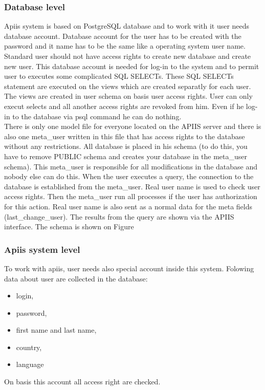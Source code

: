 \subsubsection{Database level}
Apiis system is based on PostgreSQL database and to work with it user needs database account. Database account for the user has to be created with the password and it name has to be the same like a operating system user name. Standard user should not have access rights to create new database and create new user. This database account is needed for log-in to the system and to permit user to executes some complicated SQL SELECTs. These SQL SELECTs statement are executed on the views which are created separatly for each user. The views are created in user schema on basis user access rights. User can only execut selects and all another access rights are revoked from him. Even if he log-in to the database via psql command he can do nothing.\\
There is only one model file for everyone located on the APIIS server and there is also one meta\_user written in this file that has access rights to the database without any restrictions. All database is placed in his schema (to do this, you have to remove PUBLIC schema and creates your database in the meta\_user schema). This meta\_user is responsible for all modifications in the database and nobody else can do this. When the user executes a query, the connection to the database is established from the meta\_user. Real user name is used to check user access rights. Then the meta\_user run all processes if the user has authorization for this action. Real user name is also sent as a normal data for the meta fields (last\_change\_user).
The results from the query are shown via the APIIS interface. The
schema is shown on Figure 

\subsubsection{Apiis system level}
To work with apiis, user needs also special account inside this system. Folowing data about user are collected in the database:
\begin{itemize}
\item login,
\item password, 
\item first name and last name,
\item country,
\item language
\end{itemize}   
On basis this account all access right are checked.


